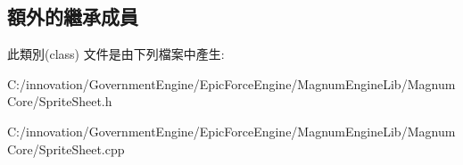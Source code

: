 \subsection*{額外的繼承成員}


此類別(class) 文件是由下列檔案中產生\+:\begin{DoxyCompactItemize}
\item 
C\+:/innovation/\+Government\+Engine/\+Epic\+Force\+Engine/\+Magnum\+Engine\+Lib/\+Magnum\+Core/Sprite\+Sheet.\+h\item 
C\+:/innovation/\+Government\+Engine/\+Epic\+Force\+Engine/\+Magnum\+Engine\+Lib/\+Magnum\+Core/Sprite\+Sheet.\+cpp\end{DoxyCompactItemize}
